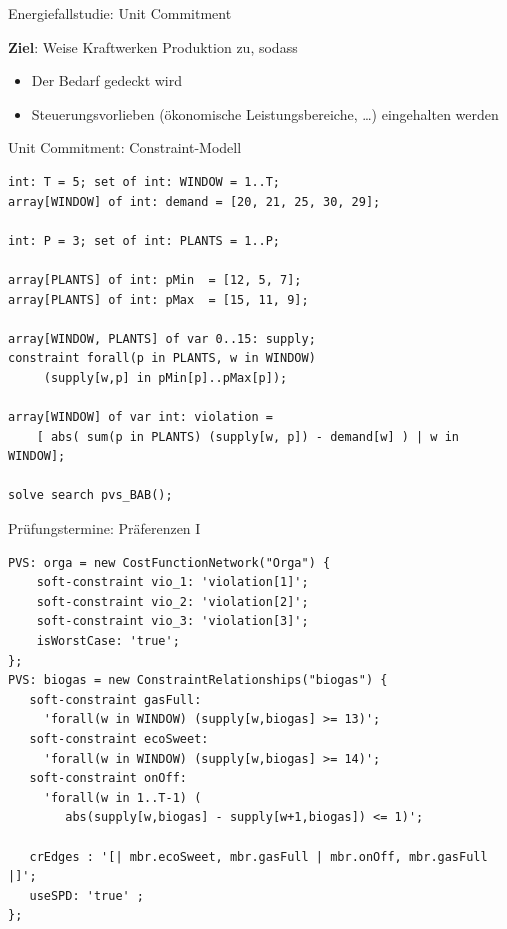 \begin{frame}[fragile]{Energiefallstudie: Unit Commitment}

\textbf{Ziel}: Weise Kraftwerken Produktion zu, sodass
\begin{itemize}
\item Der Bedarf gedeckt wird
\item Steuerungsvorlieben (ökonomische Leistungsbereiche, \ldots) eingehalten werden
\end{itemize}
\fontsize{8pt}{7.2}\selectfont
%
\end{frame}


\begin{frame}[fragile]{Unit Commitment: Constraint-Modell}
\begin{lstlisting}
int: T = 5; set of int: WINDOW = 1..T;
array[WINDOW] of int: demand = [20, 21, 25, 30, 29];

int: P = 3; set of int: PLANTS = 1..P;

array[PLANTS] of int: pMin  = [12, 5, 7];
array[PLANTS] of int: pMax  = [15, 11, 9];

array[WINDOW, PLANTS] of var 0..15: supply; 
constraint forall(p in PLANTS, w in WINDOW) 
     (supply[w,p] in pMin[p]..pMax[p]);

array[WINDOW] of var int: violation = 
    [ abs( sum(p in PLANTS) (supply[w, p]) - demand[w] ) | w in WINDOW];

solve search pvs_BAB();
\end{lstlisting}
\end{frame}

\begin{frame}[fragile]{Prüfungstermine: Präferenzen I}

\begin{lstlisting}
PVS: orga = new CostFunctionNetwork("Orga") {
    soft-constraint vio_1: 'violation[1]';
    soft-constraint vio_2: 'violation[2]';
    soft-constraint vio_3: 'violation[3]';
    isWorstCase: 'true';
};
PVS: biogas = new ConstraintRelationships("biogas") {
   soft-constraint gasFull: 
     'forall(w in WINDOW) (supply[w,biogas] >= 13)';
   soft-constraint ecoSweet: 
     'forall(w in WINDOW) (supply[w,biogas] >= 14)';
   soft-constraint onOff: 
     'forall(w in 1..T-1) ( 
        abs(supply[w,biogas] - supply[w+1,biogas]) <= 1)';
   
   crEdges : '[| mbr.ecoSweet, mbr.gasFull | mbr.onOff, mbr.gasFull |]';
   useSPD: 'true' ;
}; 
\end{lstlisting}
\end{frame}

